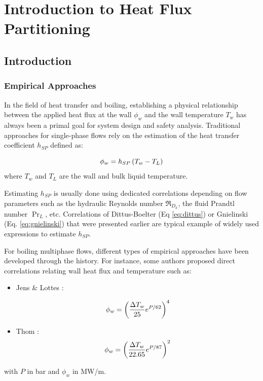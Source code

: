 
\chapter{Introduction to Heat Flux Partitioning} %

\label{chap:HFP_bib} %

\minitoc

\section{Introduction}

\subsection{Empirical Approaches}

In the field of heat transfer and boiling, establishing a physical relationship between the applied heat flux at the wall $\phi_{w}$ and the wall temperature $T_{w}$ has always been a primal goal for system design and safety analysis. Traditional approaches for single-phase flows rely on the estimation of the heat transfer coefficient $h_{SP}$ defined as:

\begin{equation}
\phi_{w} = h_{SP} \left( T_{w} - T_{L} \right)
\end{equation}
where $T_{w}$ and $T_{L}$ are the wall and bulk liquid temperature. 

\npar
Estimating $h_{SP}$ is usually done using dedicated correlations depending on flow parameters such as the hydraulic Reynolds number $\Re_{D_{h}}$, the fluid Prandtl number $\Pr_{L}$, etc. Correlations of Dittus-Boelter (Eq \ref{eq:dittus}) or Gnielinski (Eq. \ref{eq:gnielinski}) that were presented earlier are typical example of widely used expressions to estimate $h_{SP}$.

\npar

For boiling multiphase flows, different types of empirical approaches have been developed through the history. For instance, some authors proposed direct correlations relating wall heat flux and temperature such as:

\begin{itemize}
\item Jens \& Lottes \cite{jens_analysis_1951}:

\begin{equation}
\phi_{w} = \left(  \frac{\Delta T_{w} }{25} e^{P / 62}	 \right)^{4}
\label{eq:jens_correl}
\end{equation}

\item Thom \etal \cite{thom_boiling_1967}:
\begin{equation}
\phi_{w} = \left(  \frac{\Delta T_{w} }{22.65} e^{P / 87}	 \right)^{2}
\label{eq:thom_correl}
\end{equation}
\end{itemize} 
with $P$ in bar and $\phi_{w}$ in MW/m.

